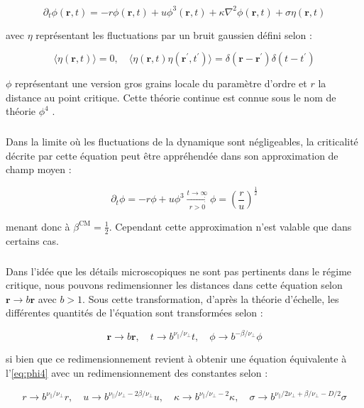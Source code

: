 \begin{equation}
	\partial_t \phi (\mathbf{r}, t) = -r\phi (\mathbf{r}, t) + u \phi^3(\mathbf{r}, t) + \kappa\nabla^2 \phi (\mathbf{r}, t) + \sigma\eta(\mathbf{r}, t)
\end{equation}

\noindent avec $\eta$ représentant les fluctuations par un bruit gaussien défini selon :

\begin{equation}
\langle \eta(\mathbf{r}, t) \rangle = 0, \quad \langle \eta(\mathbf{r}, t) \eta(\mathbf{r}^\prime, t^\prime)\rangle = \delta(\mathbf{r}-\mathbf{r}^\prime)\delta(t-t^\prime)
\label{eq:phi4}
\end{equation}

\noindent $\phi$ représentant une version gros grains locale du paramètre d'ordre et $r$ la distance au point critique. Cette théorie continue est connue sous le nom de théorie $\phi^4$ \cite{kardar_statistical_2007}.

\subparagraph{}Dans la limite où les fluctuations de la dynamique sont négligeables, la criticalité décrite par cette équation peut être appréhendée dans son approximation de champ moyen :

\begin{equation}
	\partial_t \phi = -r\phi + u\phi^3 \xrightarrow[r>0]{t\rightarrow \infty} \phi = \left( \frac{r}{u} \right)^\frac{1}{2}
\end{equation}

\noindent menant donc à $\beta^\text{CM} = \frac{1}{2}$. Cependant cette approximation n'est valable que dans certains cas.

\subparagraph{}Dans l'idée que les détails microscopiques ne sont pas pertinents dans le régime critique, nous pouvons redimensionner les distances dans cette équation selon $\mathbf{r}\rightarrow b\mathbf{r}$ avec $b>1$. Sous cette transformation, d'après la théorie d'échelle, les différentes quantités de l'équation sont transformées selon :

\begin{equation}
	\mathbf{r}\rightarrow b\mathbf{r}, \quad t \rightarrow b^{\nu_\parallel/\nu_\perp}t, \quad \phi \rightarrow b^{-\beta/\nu_\perp}\phi
\end{equation}

\noindent si bien que ce redimensionnement revient à obtenir une équation équivalente à l'\autoref{eq:phi4} avec un redimensionnement des constantes selon :

\begin{equation}
	r \rightarrow b^{\nu_\parallel/\nu_\perp} r, \quad u \rightarrow b^{\nu_\parallel/\nu_\perp - 2\beta/\nu_\perp} u, \quad \kappa \rightarrow b^{\nu_\parallel/\nu_\perp-2}\kappa, \quad \sigma \rightarrow b^{\nu_\parallel/2\nu_\perp+\beta/\nu_\perp - D/2}\sigma
\end{equation}

